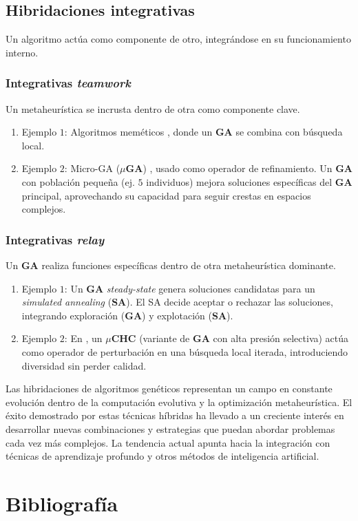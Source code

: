 \documentclass[12pt,letterpaper]{article}
\begin{document}
\subsection{Hibridaciones integrativas}
Un algoritmo actúa como componente de otro, integrándose en su funcionamiento interno.

\subsubsection{Integrativas \textit{teamwork}}
Un metaheurística se incrusta dentro de otra como componente clave.
\begin{enumerate}
    \item Ejemplo $1$: Algoritmos meméticos \cite{memetics}, donde un \textbf{GA} se combina con búsqueda local. 
    \item Ejemplo $2$: Micro-GA ($\mu$\textbf{GA}) \cite{930311}, usado como operador de refinamiento. Un \textbf{GA} con población pequeña (ej. $5$ individuos) mejora soluciones específicas del \textbf{GA} principal, aprovechando su capacidad para seguir crestas en espacios complejos.
\end{enumerate}

\subsubsection{Integrativas \textit{relay}}
Un \textbf{GA} realiza funciones específicas dentro de otra metaheurística dominante.

\begin{enumerate}
    \item Ejemplo $1$: Un \textbf{GA} \textit{steady-state} genera soluciones candidatas para un \textit{simulated annealing} (\textbf{SA}). El SA decide aceptar o rechazar las soluciones, integrando exploración (\textbf{GA}) y explotación (\textbf{SA}).
    \item Ejemplo $2$: En \cite{microchc}, un $\mu$\textbf{CHC} (variante de \textbf{GA} con alta presión selectiva) actúa como operador de perturbación en una búsqueda local iterada, introduciendo diversidad sin perder calidad.
\end{enumerate}

Las hibridaciones de algoritmos genéticos representan un campo en constante evolución dentro de la computación evolutiva y la optimización metaheurística. El éxito demostrado por estas técnicas híbridas ha llevado a un creciente interés en desarrollar nuevas combinaciones y estrategias que puedan abordar problemas cada vez más complejos. La tendencia actual apunta hacia la integración con técnicas de aprendizaje profundo y otros métodos de inteligencia artificial.

\newpage
\section{Bibliografía}

\printbibliography[heading=none, category=cited]
\end{document}

